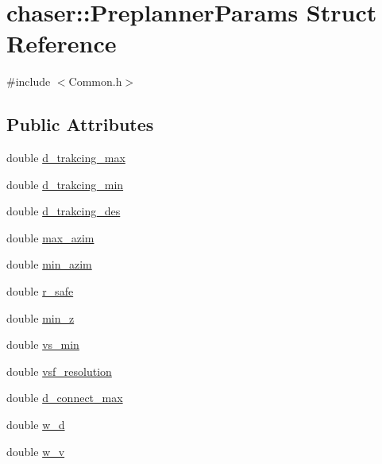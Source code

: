 \hypertarget{structchaser_1_1_preplanner_params}{}\section{chaser\+:\+:Preplanner\+Params Struct Reference}
\label{structchaser_1_1_preplanner_params}


{\ttfamily \#include $<$Common.\+h$>$}

\subsection*{Public Attributes}
\begin{DoxyCompactItemize}
\item 
double \hyperlink{structchaser_1_1_preplanner_params_ad6659842d3039da7b064532a090651d3}{d\+\_\+trakcing\+\_\+max}
\item 
double \hyperlink{structchaser_1_1_preplanner_params_aeef51c9ac61b5fa70c853463a27ff879}{d\+\_\+trakcing\+\_\+min}
\item 
double \hyperlink{structchaser_1_1_preplanner_params_a6a950244cbb256abb9a4e93388c0177f}{d\+\_\+trakcing\+\_\+des}
\item 
double \hyperlink{structchaser_1_1_preplanner_params_ab357e30646928070cd553ccf14be0beb}{max\+\_\+azim}
\item 
double \hyperlink{structchaser_1_1_preplanner_params_aa6846dd2e2d69d5f0d5a9b30710db6e1}{min\+\_\+azim}
\item 
double \hyperlink{structchaser_1_1_preplanner_params_a409be3b01b1b4853919d5b34e529c49a}{r\+\_\+safe}
\item 
double \hyperlink{structchaser_1_1_preplanner_params_ad23cd70894c614834c2a80e35de3e373}{min\+\_\+z}
\item 
double \hyperlink{structchaser_1_1_preplanner_params_a2abe7915546a5d2ebde667a1d5ccfb44}{vs\+\_\+min}
\item 
double \hyperlink{structchaser_1_1_preplanner_params_ac30a8ee32bae78f84b863234853f6497}{vsf\+\_\+resolution}
\item 
double \hyperlink{structchaser_1_1_preplanner_params_a90021bd30b7e88b50cf9317ff3673482}{d\+\_\+connect\+\_\+max}
\item 
double \hyperlink{structchaser_1_1_preplanner_params_ae443edaa7e2912a6a7643272305c91f5}{w\+\_\+d}
\item 
double \hyperlink{structchaser_1_1_preplanner_params_a1778793e5b16806c867291c1a5471a04}{w\+\_\+v}
\end{DoxyCompactItemize}


